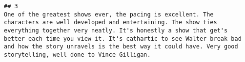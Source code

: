 \documentclass[
]{article}
\begin{document}
\begin{verbatim}
## 3                                                                                                                                                                                                                                                                                                                                                                                                                                                                                                                                                                                                                                                                                                                                                                                                                                                                                                                                                                                                                                                                                                                                                                                                                                                                                                                                                                                                                                                                                                                                                                                                                                                                                                                                                                                                                                   One of the greatest shows ever, the pacing is excellent. The characters are well developed and entertaining. The show ties everything together very neatly. It's honestly a show that get's better each time you view it. It's cathartic to see Walter break bad and how the story unravels is the best way it could have. Very good storytelling, well done to Vince Gilligan.

\end{verbatim}
\end{document}
